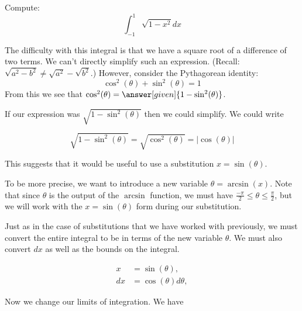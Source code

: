 \documentclass{ximera}
\begin{document}
\begin{example}
  Compute:
  \[
  \int_{-1}^1 \sqrt{1-x^2} dx
  \]
  \begin{explanation}

    The difficulty with this integral is that we have a square root of a difference of two terms.
    We can't directly simplify such an expression. (Recall:  $\sqrt{a^2-b^2} \neq \sqrt{a^2} - \sqrt{b^2}$.)  However, consider the Pythagorean identity:
    \[
    \cos^2(\theta) + \sin^2(\theta) = 1
    \]
    From this we see that $\cos^2(\theta)=
    \answer[given]{1-\sin^2(\theta)}$.


   If our expression was $\sqrt{1-\sin^{2}(\theta)}$ then we could simplify.
   We could write 

\[
\sqrt{1-\sin^{2}(\theta)}=\sqrt{\cos^{2}(\theta)}=|\cos(\theta)|
\]
%

This suggests that it would be useful to use a substitution $x=\sin(\theta)$. 

\begin{remark}
To be more precise, we want to introduce a new variable $\theta=\arcsin(x)$. 
Note that since $\theta$ is the output of the $\arcsin$ function, we must have $\frac{-\pi}{2} \leq \theta \leq \frac{\pi}{2} $, but we will work with the $x=\sin(\theta)$ form during our substitution.
\end{remark}

Just as in the case of substitutions that we have worked with previously, we must convert the entire integral to be in terms of the new variable $\theta$. 
We must also convert  $dx$ as well as the bounds on the integral.

    \begin{align*}
      x &=\sin(\theta),\\
      dx &= \cos(\theta) d\theta,
    \end{align*}

   Now we change our limits of
    integration. We have 


\end{explanation}
\end{example}
\end{document}
